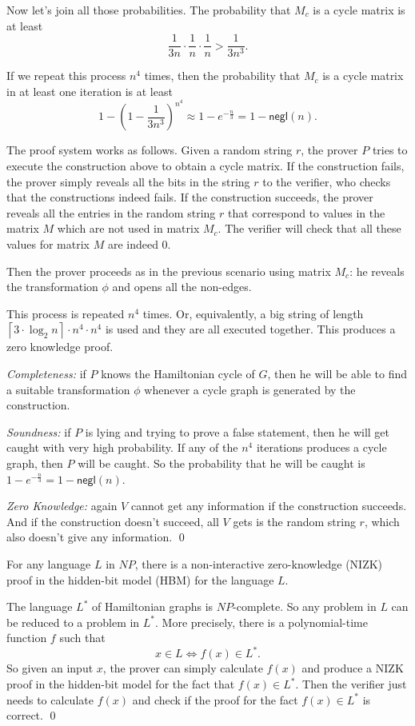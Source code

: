\documentclass[12pt]{tufte-book}
\begin{document}
Now let's join all those probabilities. The probability that $M_c$ is a cycle matrix is at least
$$\frac{1}{3n}\cdot \frac{1}{n}\cdot \frac{1}{n} > \frac{1}{3n^3}.$$

If we repeat this process $n^4$ times, then the probability that $M_c$ is a cycle matrix in at least one iteration is at least
$$1-\left(1-\frac{1}{3n^3}\right)^{n^4}\approx 1-e^{-\frac{n}{3}} = 1-\mathsf{negl}(n).$$


\bigskip
The proof system works as follows. Given a random string $r$, the prover $P$ tries
to execute the construction above to obtain a cycle matrix.
If the construction fails, the prover simply reveals all the bits in the string $r$
to the verifier, who checks that the constructions indeed fails.
If the construction succeeds, the prover reveals all the entries in the random string $r$
that correspond to values in the matrix $M$ which are not used in matrix $M_c$.
The verifier will check that all these values for matrix $M$ are indeed 0.

Then the prover proceeds as in the previous scenario using matrix $M_c$: he
reveals the transformation $\phi$ and opens all the non-edges.

This process is repeated $n^4$ times. Or, equivalently, a big string of length
$\left\lceil 3\cdot \log_2 n\right\rceil \cdot n^4\cdot n^4$ is used and they are all
executed together. This produces a zero knowledge proof.

\textit{Completeness:} if $P$ knows the Hamiltonian cycle of $G$,
then he will be able to find a suitable transformation $\phi$ whenever a cycle graph is
generated by the construction.

\textit{Soundness:} if $P$ is lying and trying to prove a false statement, then he will
get caught with very high probability. If any of the $n^4$ iterations produces a cycle
graph, then $P$ will be caught. So the probability that he will be caught is
$1-e^{-\frac{n}{3}} = 1-\mathsf{negl}(n)$.

\textit{Zero Knowledge:} again $V$ cannot get any information if the construction succeeds.
And if the construction doesn't succeed, all $V$ gets is the random string $r$, which also
doesn't give any information.
\qed


\begin{theorem}
For any language $L$ in $NP$, there is a non-interactive zero-knowledge (NIZK) proof
in the hidden-bit model (HBM) for the language $L$.
\end{theorem}
\proof
The language $L^*$ of Hamiltonian graphs is $NP$-complete. So any problem in $L$ can
be reduced to a problem in $L^*$. More precisely, there is a polynomial-time function
$f$ such that
$$x\in L \Longleftrightarrow f(x)\in L^*.$$
So given an input $x$, the prover can simply calculate $f(x)$ and
produce a NIZK proof in the hidden-bit model for the fact that $f(x)\in L^*$.
Then the verifier just needs to calculate $f(x)$ and check if the proof for the fact
$f(x)\in L^*$ is correct.
\qed
\end{document}
